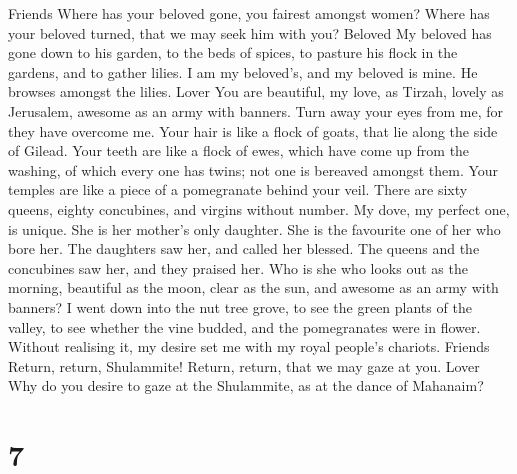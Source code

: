 Friends  Where has your beloved gone, you fairest amongst
women? Where has your beloved turned, that we may seek him with you?
Beloved  My beloved has gone down to his garden, to the
beds of spices, to pasture his flock in the gardens, and to gather
lilies.  I am my beloved's, and my beloved is mine. He
browses amongst the lilies. Lover  You are beautiful, my
love, as Tirzah, lovely as Jerusalem, awesome as an army with banners.
 Turn away your eyes from me, for they have overcome me.
Your hair is like a flock of goats, that lie along the side of Gilead.
 Your teeth are like a flock of ewes, which have come up
from the washing, of which every one has twins; not one is bereaved
amongst them.  Your temples are like a piece of a
pomegranate behind your veil.  There are sixty queens,
eighty concubines, and virgins without number.  My dove,
my perfect one, is unique. She is her mother's only daughter. She is the
favourite one of her who bore her. The daughters saw her, and called her
blessed. The queens and the concubines saw her, and they praised her.
 Who is she who looks out as the morning, beautiful as
the moon, clear as the sun, and awesome as an army with banners?
 I went down into the nut tree grove, to see the green
plants of the valley, to see whether the vine budded, and the
pomegranates were in flower.  Without realising it, my
desire set me with my royal people's chariots. Friends 
Return, return, Shulammite! Return, return, that we may gaze at you.
Lover Why do you desire to gaze at the Shulammite, as at the dance of
Mahanaim?

\hypertarget{section-6}{%
\section{7}\label{section-6}}

